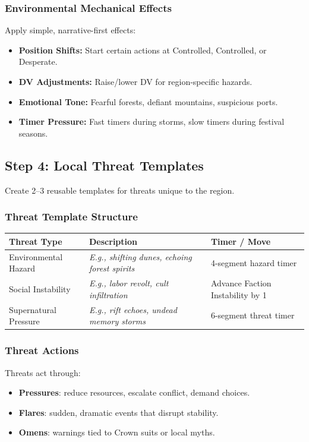 \documentclass[11pt]{article}
\begin{document}
\subsubsection{Environmental Mechanical Effects}
Apply simple, narrative-first effects:
\begin{itemize}
    \item \textbf{Position Shifts:} Start certain actions at Controlled, Controlled, or Desperate.
    \item \textbf{DV Adjustments:} Raise/lower DV for region-specific hazards.
    \item \textbf{Emotional Tone:} Fearful forests, defiant mountains, suspicious ports.
    \item \textbf{Timer Pressure:} Fast timers during storms, slow timers during festival seasons.
\end{itemize}

\subsection{Step 4: Local Threat Templates}

Create 2--3 reusable templates for threats unique to the region.

\subsubsection{Threat Template Structure}
\begin{center}
\begin{longtable}{|p{4cm}|p{5cm}|p{4cm}|}
\hline
\textbf{Threat Type} & \textbf{Description} & \textbf{Timer / Move} \\
\hline
Environmental Hazard & \emph{E.g., shifting dunes, echoing forest spirits} & 4-segment hazard timer \\
\hline
Social Instability & \emph{E.g., labor revolt, cult infiltration} & Advance Faction Instability by 1 \\
\hline
Supernatural Pressure & \emph{E.g., rift echoes, undead memory storms} & 6-segment threat timer \\
\hline
\end{longtable}
\end{center}

\subsubsection{Threat Actions}
Threats act through:
\begin{itemize}
    \item \textbf{Pressures}: reduce resources, escalate conflict, demand choices.
    \item \textbf{Flares}: sudden, dramatic events that disrupt stability.
    \item \textbf{Omens}: warnings tied to Crown suits or local myths.
\end{itemize}
\end{document}
